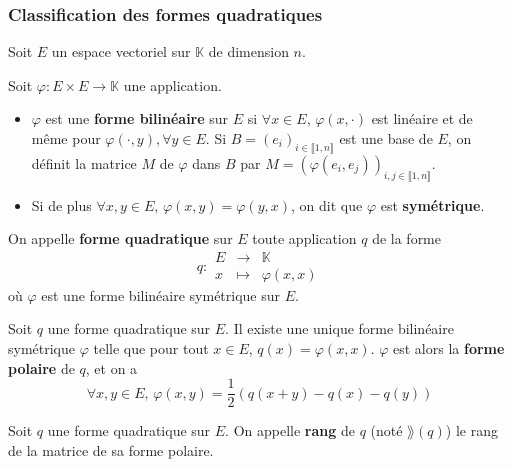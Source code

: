 	\subsubsection{Classification des formes quadratiques}
	
	
	Soit $E$ un espace vectoriel sur $\mathbb{K}$ de dimension $n$.
	
	\begin{definition}
		Soit $\varphi : E \times E \rightarrow \mathbb{K}$ une application.
		\begin{itemize}
			\item $\varphi$ est une \textbf{forme bilinéaire} sur $E$ si $\forall x \in E, \, \varphi(x,\cdot)$ est linéaire et de même pour $\varphi(\cdot,y), \forall y \in E$. Si $B=(e_i)_{i \in \llbracket 1, n \rrbracket}$ est une base de $E$, on définit la matrice $M$ de $\varphi$ dans $B$ par $M=(\varphi(e_i,e_j))_{i,j \in \llbracket 1, n \rrbracket}$.
			\item Si de plus $\forall x, y \in E, \, \varphi(x, y) = \varphi(y, x)$, on dit que $\varphi$ est \textbf{symétrique}.
		\end{itemize}
	\end{definition}
	
	\begin{definition}
		On appelle \textbf{forme quadratique} sur $E$ toute application $q$ de la forme
		\[
		q :
		\begin{array}{ccc}
			E &\rightarrow& \mathbb{K} \\
			x &\mapsto& \varphi(x, x)
		\end{array}
		\]
		où $\varphi$ est une forme bilinéaire symétrique sur $E$.
	\end{definition}
	
	\begin{proposition}
		Soit $q$ une forme quadratique sur $E$. Il existe une unique forme bilinéaire symétrique $\varphi$ telle que pour tout $x \in E$, $q(x)=\varphi(x,x)$.
		\newpar
		$\varphi$ est alors la \textbf{forme polaire} de $q$, et on a
		\[ \forall x, y \in E, \, \varphi(x,y) = \frac{1}{2} (q(x+y) - q(x) - q(y)) \]
	\end{proposition}
	
	\begin{definition}
		Soit $q$ une forme quadratique sur $E$. On appelle \textbf{rang} de $q$ (noté $\rang(q)$) le rang de la matrice de sa forme polaire.
	\end{definition}
	
